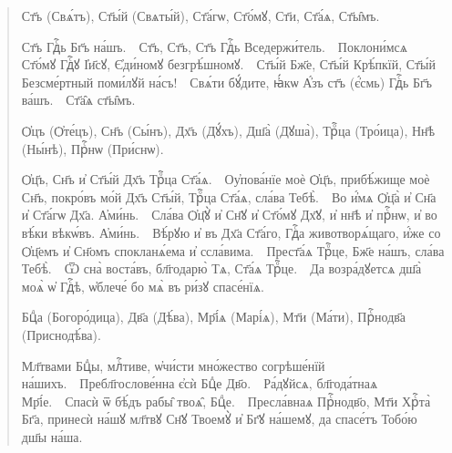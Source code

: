 \documentclass[11pt,a4paper,oneside]{memoir}
\newcommand{\exercise}{}
\newcommand{\exquote}{quote}
\newcommand{\pstyle}{\textenglish}
\newcommand{\pxp}[1]{\pstyle{(}#1\pstyle{)}}
\newcommand{\sdash}{\textenglish{\textemdash}}
\begin{document}
    \begin{\exquote}\begin{slv}
        Ст҃ъ \pxp{Свѧ́тъ}, Ст҃ы́й \pxp{Свѧты́й}, Ст҃а́гѡ, Ст҃о́мꙋ, Ст҃и, Ст҃а́ѧ, Ст҃ы̑мъ.
        
        Ст҃ъ Гдⷭ҇ь Бг҃ъ на́шъ.~\sdash~Ст҃ъ, Ст҃ъ, Ст҃ъ Гдⷭ҇ь Вседержи́тель.~\sdash~Поклони́мсѧ Ст҃о́мꙋ Гдⷭ҇ꙋ І҆и҃сꙋ, Є҆ди́номꙋ безгрѣ́шномꙋ.~\sdash~Ст҃ы́й Бж҃е, Ст҃ы́й Крѣ́пкїй, Ст҃ы́й Безсме́ртный поми́лꙋй на́съ!~\sdash~Свѧ́ти бꙋ́дите, ꙗ҆́кѡ А҆́зъ ст҃ъ \pxp{є҆́смь} Гдⷭ҇ь Бг҃ъ ва́шъ.~\sdash~Ст҃а̑ѧ ст҃ы̑мъ.
        
        Ѻ҆цъ \pxp{Ѻ҆те́цъ}, Сн҃ъ \pxp{Сы́нъ}, Дх҃ъ \pxp{Дꙋ́хъ}, Дш҃а̀ \pxp{Дꙋша̀}, Трⷪ҇ца \pxp{Тро́ица}, Нн҃ѣ \pxp{Ны́нѣ}, Прⷭ҇нѡ \pxp{При́снѡ}.
        
        Ѻ҆ц҃ъ, Сн҃ъ и҆ Ст҃ы́й Дх҃ъ Трⷪ҇ца Ст҃а́ѧ.~\sdash~Оу҆пова́нїе моѐ Ѻ҆ц҃ъ, прибѣ́жище моѐ Сн҃ъ, покро́въ мо́й Дх҃ъ Ст҃ы́й, Трⷪ҇ца Ст҃а́ѧ, сла́ва Тебѣ̀.~\sdash~Во и҆́мѧ Ѻ҆ц҃а̀ и҆ Сн҃а и҆ Ст҃а́гѡ Дх҃а. А҆ми́нь.~\sdash~Сла́ва Ѻ҆ц҃ꙋ̀ и҆ Сн҃ꙋ и҆ Ст҃о́мꙋ Дх҃ꙋ, и҆ нн҃ѣ и҆ прⷭ҇нѡ, и҆ во вѣ́ки вѣкѡ́въ. А҆ми́нь.~\sdash~Вѣ́рꙋю и҆ въ Дх҃а Ст҃а́го, Гдⷭ҇а животворѧ́щаго, и҆́же со Ѻ҆ц҃емъ и҆ Сн҃омъ спокланѧ́ема и҆ ссла́вима.~\sdash~Прест҃а́ѧ Трⷪ҇це, Бж҃е на́шъ, сла́ва Тебѣ̀.~\sdash~Ѿ сна̀ воста́въ, бл҃годарю̀ Тѧ, Ст҃а́ѧ Трⷪ҇це.~\sdash~Да возра́дꙋетсѧ дш҃а̀ моѧ̀ ѡ҆ Гдⷭ҇ѣ, ѡ҆блече́ бо мѧ̀ въ ри́зꙋ спасе́нїѧ.
        
        Бцⷣа \pxp{Богоро́дица}, Дв҃а \pxp{Дѣ́ва}, Мр҃і́ѧ \pxp{Марі́ѧ}, Мт҃и \pxp{Ма́ти}, Прⷭ҇нодв҃а \pxp{Приснодѣ́ва}.
        
        Мл҃твами Бцⷣы, млⷭ҇тиве, ѡ҆чи́сти мно́жество согрѣше́нїй на́шихъ.~\sdash~Пребл҃гослове́нна є҆сѝ Бцⷣе Дв҃о.~\sdash~Ра́дꙋйсѧ, бл҃года́тнаѧ Мр҃і́е.~\sdash~Спасѝ ѿ бѣ́дъ рабы̑ твоѧ̑, Бцⷣе.~\sdash~Пресла́внаѧ Прⷭ҇нодв҃о, Мт҃и Хрⷭ҇та̀ Бг҃а, принесѝ на́шꙋ мл҃твꙋ Сн҃ꙋ Твоемꙋ̀ и҆ Бг҃ꙋ на́шемꙋ, да спасе́тъ Тобо́ю дш҃ы на́ша.
    \end{slv}\end{\exquote}
    \medskip

                    \paragraph{\exercise}
\end{document}
